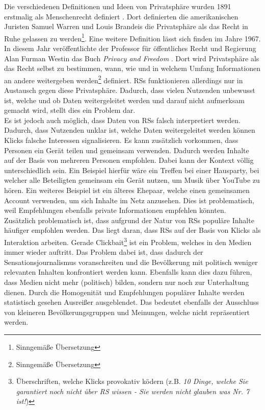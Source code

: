 Die verschiedenen Definitionen und Ideen von Privatsphäre wurden 1891 erstmalig als Menschenrecht definiert \cite{history-of-privacy}.
Dort definierten die amerikanischen Juristen Samuel Warren und Louis Brandeis die Privatsphäre als \glqq das Recht in Ruhe gelassen zu werden\grqq{}\footnote{Sinngemäße Übersetzung}.
Eine weitere Definition lässt sich finden im Jahre 1967.
In diesem Jahr veröffentlichte der Professor für öffentliches Recht und Regierung Alan Furman Westin das Buch \textit{Privacy and Freedom} \cite{privacy-and-freedom}.
Dort wird Privatsphäre als \glqq das Recht selbst zu bestimmen, wann, wie und in welchem Umfang Informationen an andere weitergeben werden\grqq{}\footnote{Sinngemäße Übersetzung} definiert.
\acp{RS} funktionieren allerdings nur in Austausch gegen diese Privatsphäre.
Dadurch, dass vielen Nutzenden unbewusst ist, welche und ob Daten weitergeleitet werden und darauf nicht aufmerksam gemacht wird, stellt dies ein Problem dar. \\

Es ist jedoch auch möglich, dass Daten von \acp{RS} falsch interpretiert werden.
Dadurch, dass Nutzenden unklar ist, welche Daten weitergeleitet werden können Klicks falsche Interessen signalisieren.
Es kann zusätzlich vorkommen, dass Personen ein Gerät teilen und gemeinsam verwenden.
Dadurch werden Inhalte auf der Basis von mehreren Personen empfohlen.
Dabei kann der Kontext völlig unterschiedlich sein.
Ein Beispiel hierfür wäre ein Treffen bei einer Hausparty, bei welcher alle Beteiligten gemeinsam ein Gerät nutzen, um Musik über YouTube zu hören.
Ein weiteres Beispiel ist ein älteres Ehepaar, welche einen gemeinsamen Account verwenden, um sich Inhalte im Netz anzusehen.
Dies ist problematisch, weil Empfehlungen ebenfalls private Informationen empfehlen könnten. \\

Zusätzlich problematisch ist, dass aufgrund der Natur von \acp{RS} populäre Inhalte häufiger empfohlen werden.
Das liegt daran, dass \acp{RS} auf der Basis von Klicks als Interaktion arbeiten.
Gerade Clickbait\footnote{Überschriften, welche Klicks provokativ ködern (z.B. \textit{10 Dinge, welche Sie garantiert noch nicht über \ac{RS} wissen - Sie werden nicht glauben was Nr. 7 ist!})} ist ein Problem, welches in den Medien immer wieder auftritt.
Das Problem dabei ist, dass dadurch der Sensationsjournalismus voranschreiten und die Bevölkerung mit politisch weniger relevanten Inhalten konfrontiert werden kann.
Ebenfalls kann dies dazu führen, dass Medien nicht mehr (politisch) bilden, sondern nur noch zur Unterhaltung dienen.
Durch die Homogenität und Empfehlungen populärer Inhalte werden statistisch gesehen Ausreißer ausgeblendet.
Das bedeutet ebenfalls der Ausschluss von kleineren Bevölkerungsgruppen und Meinungen, welche nicht repräsentiert werden. \\

